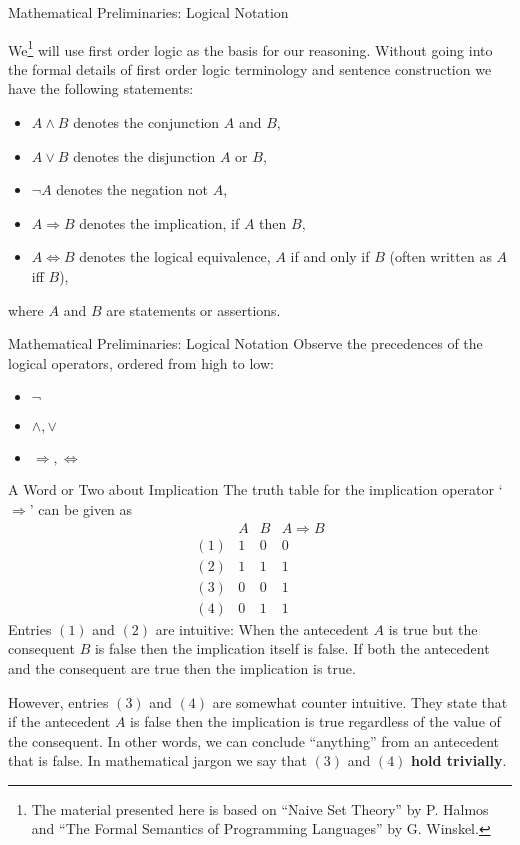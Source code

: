 \documentclass{beamer}
\begin{document}
\begin{frame}{\large Mathematical  Preliminaries: Logical Notation}

We\footnote{\tiny The material presented here is based on ``Naive Set Theory'' by P. Halmos and ``The Formal Semantics of Programming Languages'' by G. Winskel.}
will use first order logic as the basis for our reasoning.  Without going into the formal details
of first order logic terminology and sentence construction we have the following statements:
\begin{itemize}
\item $A \wedge B$ denotes the conjunction $A$ and $B$,
\item $A \vee B$ denotes the disjunction $A$ or $B$,
\item $\neg A$ denotes the negation not $A$,
\item $A \Rightarrow B$ denotes the implication, if $A$ then $B$,
\item $A \Leftrightarrow B$ denotes the logical equivalence, $A$ if and only if $B$ (often
written as $A$ iff $B$),
\end{itemize}
where $A$ and $B$ are statements or assertions.
\vspace{.1in}
 \end{frame}

\begin{frame}{\large Mathematical  Preliminaries: Logical Notation}
Observe the precedences of the logical operators, ordered from high to low:
\begin{itemize}
\item $\neg$
\item $\wedge,\vee$
\item $\Rightarrow, \Leftrightarrow$
\end{itemize}
\end{frame}


\begin{frame}{A Word or Two about Implication}
The truth table for the implication operator `$\Rightarrow$' can be given as
{\scriptsize
\[
\begin{array}{lcc|c}
&A & B & A \Rightarrow B\\ \hline
(1)& 1 & 0 & 0\\
(2) & 1 & 1 & 1\\
(3) & 0 & 0 & 1\\
(4) & 0 & 1 & 1
\end{array}
\]
}
Entries $(1)$ and $(2)$ are intuitive: When the antecedent $A$ is true but the consequent $B$ is false then
the implication itself is false.  If both the antecedent and the consequent are true then the implication is true.

\vspace{.1in}

However, entries $(3)$ and $(4)$ are somewhat counter intuitive.  They state that if the antecedent $A$ is false
then the implication is true regardless of the value of the consequent.  In other words, we can conclude ``anything''
from an antecedent that is false.  In mathematical jargon we say that $(3)$ and $(4)$  {\bf hold trivially}.
\end{frame}
\end{document}
